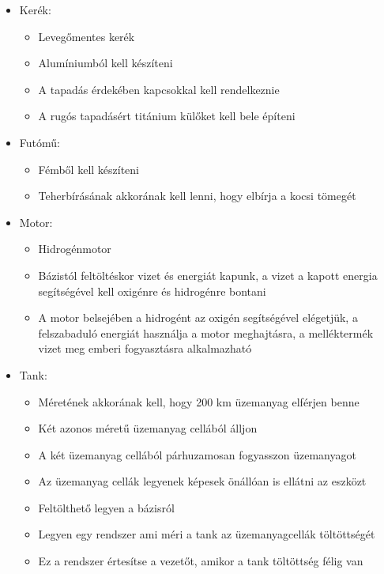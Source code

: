 \documentclass[12pt]{report}
\begin{document}
\begin{itemize}
    \item {} Kerék:
        \begin{itemize}
            \item Levegőmentes kerék
            \item Alumíniumból kell készíteni
            \item A tapadás érdekében kapcsokkal kell rendelkeznie
            \item A rugós tapadásért titánium külőket kell bele építeni
        \end{itemize}
    \item {} Futómű:
        \begin{itemize}
            \item Fémből kell készíteni
            \item Teherbírásának akkorának kell lenni, hogy elbírja a kocsi tömegét
        \end{itemize}
    \item {} Motor:
        \begin{itemize}
            \item Hidrogénmotor
            \item Bázistól feltöltéskor vizet és energiát kapunk, a vizet a kapott energia segítségével kell oxigénre és hidrogénre bontani
            \item A motor belsejében a hidrogént az oxigén segítségével elégetjük, a felszabaduló energiát használja a motor meghajtásra, a melléktermék vizet meg emberi fogyasztásra alkalmazható
        \end{itemize}
    \item {} Tank:
        \begin{itemize}
            \item Méretének akkorának kell, hogy 200 km üzemanyag elférjen benne
            \item Két azonos méretű üzemanyag cellából álljon
            \item A két üzemanyag cellából párhuzamosan fogyasszon üzemanyagot
            \item Az üzemanyag cellák legyenek képesek önállóan is ellátni az eszközt
            \item Feltölthető legyen a bázisról
            \item Legyen egy rendszer ami méri a tank az üzemanyagcellák töltöttségét
            \item Ez a rendszer értesítse a vezetőt, amikor a tank töltöttség félig van

\end{itemize}
\end{itemize}
\end{document}
